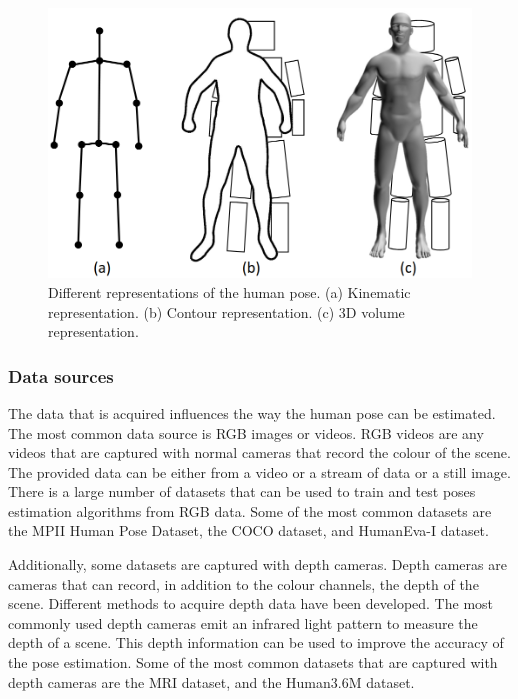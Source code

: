 \begin{figure}
    \centering
    \includegraphics[width=0.8\linewidth]{figures/HPE/PoseRepresentation.png}
    \caption[Different representations of the human pose]{Different representations of the human pose. (a) Kinematic representation. (b) Contour representation. (c) 3D volume representation. \cite{HPESurveyOriginal}}
    \label{fig:pose_representation}
\end{figure}

\subsubsection{Data sources}

The data that is acquired influences the way the human pose can be estimated. The most common data source is RGB images or videos. RGB videos are any videos that are captured with normal cameras that record the colour of the scene. The provided data can be either from a video or a stream of data or a still image. There is a large number of datasets that can be used to train and test poses estimation algorithms from RGB data. Some of the most common datasets are the MPII Human Pose Dataset\cite{MPII}, the COCO dataset\cite{Coco}, and HumanEva-I dataset\cite{HumanEva}.

Additionally, some datasets are captured with depth cameras. Depth cameras are cameras that can record, in addition to the colour channels, the depth of the scene. Different methods to acquire depth data have been developed. The most commonly used depth cameras emit an infrared light pattern to measure the depth of a scene. This depth information can be used to improve the accuracy of the pose estimation. Some of the most common datasets that are captured with depth cameras are the MRI dataset\cite{mRI}, and the Human3.6M dataset\cite{h36m_pami}.


